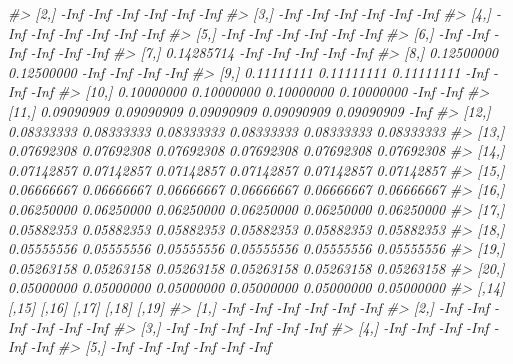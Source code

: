 \documentclass[
]{book}
\newenvironment{Shaded}{\begin{snugshade}}{\end{snugshade}}
\newcommand{\CommentTok}[1]{\textcolor[rgb]{0.56,0.35,0.01}{\textit{#1}}}
\begin{document}
\begin{Shaded}
\begin{Highlighting}[]
\CommentTok{\#\textgreater{}  [2,]       {-}Inf       {-}Inf       {-}Inf       {-}Inf       {-}Inf       {-}Inf}
\CommentTok{\#\textgreater{}  [3,]       {-}Inf       {-}Inf       {-}Inf       {-}Inf       {-}Inf       {-}Inf}
\CommentTok{\#\textgreater{}  [4,]       {-}Inf       {-}Inf       {-}Inf       {-}Inf       {-}Inf       {-}Inf}
\CommentTok{\#\textgreater{}  [5,]       {-}Inf       {-}Inf       {-}Inf       {-}Inf       {-}Inf       {-}Inf}
\CommentTok{\#\textgreater{}  [6,]       {-}Inf       {-}Inf       {-}Inf       {-}Inf       {-}Inf       {-}Inf}
\CommentTok{\#\textgreater{}  [7,] 0.14285714       {-}Inf       {-}Inf       {-}Inf       {-}Inf       {-}Inf}
\CommentTok{\#\textgreater{}  [8,] 0.12500000 0.12500000       {-}Inf       {-}Inf       {-}Inf       {-}Inf}
\CommentTok{\#\textgreater{}  [9,] 0.11111111 0.11111111 0.11111111       {-}Inf       {-}Inf       {-}Inf}
\CommentTok{\#\textgreater{} [10,] 0.10000000 0.10000000 0.10000000 0.10000000       {-}Inf       {-}Inf}
\CommentTok{\#\textgreater{} [11,] 0.09090909 0.09090909 0.09090909 0.09090909 0.09090909       {-}Inf}
\CommentTok{\#\textgreater{} [12,] 0.08333333 0.08333333 0.08333333 0.08333333 0.08333333 0.08333333}
\CommentTok{\#\textgreater{} [13,] 0.07692308 0.07692308 0.07692308 0.07692308 0.07692308 0.07692308}
\CommentTok{\#\textgreater{} [14,] 0.07142857 0.07142857 0.07142857 0.07142857 0.07142857 0.07142857}
\CommentTok{\#\textgreater{} [15,] 0.06666667 0.06666667 0.06666667 0.06666667 0.06666667 0.06666667}
\CommentTok{\#\textgreater{} [16,] 0.06250000 0.06250000 0.06250000 0.06250000 0.06250000 0.06250000}
\CommentTok{\#\textgreater{} [17,] 0.05882353 0.05882353 0.05882353 0.05882353 0.05882353 0.05882353}
\CommentTok{\#\textgreater{} [18,] 0.05555556 0.05555556 0.05555556 0.05555556 0.05555556 0.05555556}
\CommentTok{\#\textgreater{} [19,] 0.05263158 0.05263158 0.05263158 0.05263158 0.05263158 0.05263158}
\CommentTok{\#\textgreater{} [20,] 0.05000000 0.05000000 0.05000000 0.05000000 0.05000000 0.05000000}
\CommentTok{\#\textgreater{}            [,14]      [,15]      [,16]      [,17]      [,18]      [,19]}
\CommentTok{\#\textgreater{}  [1,]       {-}Inf       {-}Inf       {-}Inf       {-}Inf       {-}Inf       {-}Inf}
\CommentTok{\#\textgreater{}  [2,]       {-}Inf       {-}Inf       {-}Inf       {-}Inf       {-}Inf       {-}Inf}
\CommentTok{\#\textgreater{}  [3,]       {-}Inf       {-}Inf       {-}Inf       {-}Inf       {-}Inf       {-}Inf}
\CommentTok{\#\textgreater{}  [4,]       {-}Inf       {-}Inf       {-}Inf       {-}Inf       {-}Inf       {-}Inf}
\CommentTok{\#\textgreater{}  [5,]       {-}Inf       {-}Inf       {-}Inf       {-}Inf       {-}Inf       {-}Inf}

\end{Highlighting}
\end{Shaded}
\end{document}
